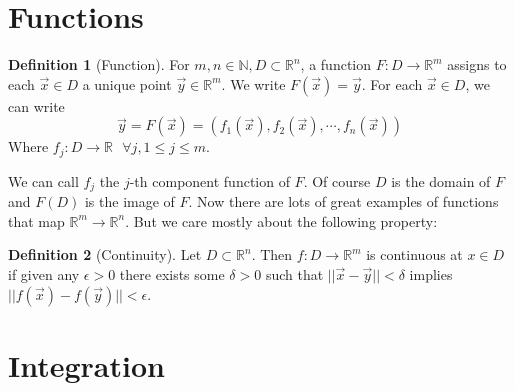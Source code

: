 \documentclass{article}
\theoremstyle{definition}
\newtheorem{definition}{Definition}[section]
\begin{document}
\section{Functions}
    \begin{definition}[Function]
        For $m,n \in \mathbb{N}, D \subset \mathbb{R}^n$, a function $F: D \rightarrow \mathbb{R}^m$ assigns to 
        each $\vec x \in D$ a unique point $\vec y \in \mathbb{R}^m$.
        We write $F(\vec x) = \vec y$. For each $\vec x \in D$, we can write 
        \[
            \vec y = F(\vec x) = (f_1(\vec x), f_2(\vec x), \cdots , f_n(\vec x))
        \]
        Where $f_j: D \rightarrow \mathbb{R} \ \ \ \forall j, 1 \leqslant j \leqslant m$.
    \end{definition}
We can call $f_j$ the $j$-th component function of $F$.
Of course $D$ is the domain of $F$ and $F(D)$ is the image of $F$.
Now there are lots of great examples of functions that map $\mathbb{R}^m \rightarrow \mathbb{R}^n$.
But we care mostly about the following property:
\begin{mdframed}
    \begin{definition}[Continuity]
        Let $D \subset \mathbb{R}^n$. Then $f:D \rightarrow \mathbb{R}^m$ is 
        continuous at $x \in D$ if given any $\epsilon > 0$ there exists some $\delta > 0$
        such that $||\vec{x} - \vec y|| < \delta$ implies $||f(\vec x) - f(\vec y)|| < \epsilon$.
    \end{definition}
\end{mdframed}

\section{Integration}
\end{document}
